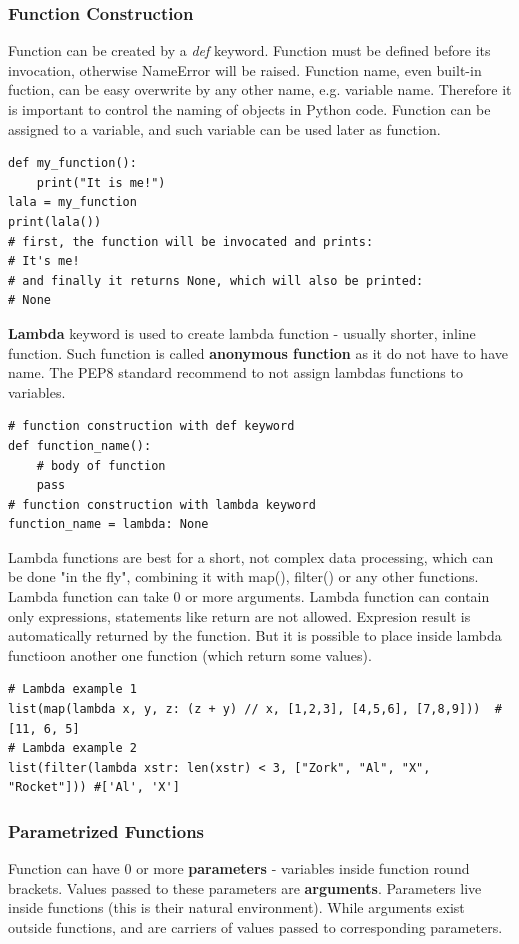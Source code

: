 \documentclass{article}
\begin{document}
	\subsubsection{Function Construction}
	Function can be created by a \textit{def} keyword. Function must be defined before its invocation, otherwise \textcolor{pythonerror}{NameError} will be raised. Function name, even built-in fuction, can be easy overwrite by any other name, e.g. variable name. Therefore it is important to control the naming of objects in Python code. 
Function can be assigned to a variable, and such variable can be used later as function.
\begin{lstlisting}[style=pystyle]
def my_function():
	print("It is me!")
lala = my_function
print(lala())
# first, the function will be invocated and prints:
# It's me!
# and finally it returns None, which will also be printed:
# None
\end{lstlisting}

\textbf{Lambda} keyword is used to create lambda function - usually shorter, inline function. Such function is called \textbf{anonymous function} as it do not have to have name. The PEP8 standard recommend to not assign lambdas functions to variables. 
	\begin{lstlisting}[style=pystyle]
# function construction with def keyword
def function_name():
	# body of function
	pass
# function construction with lambda keyword
function_name = lambda: None
	\end{lstlisting}
Lambda functions are best for a short, not complex data processing, which can be done "in the fly", combining it with map(), filter() or any other functions. Lambda function can take 0 or more arguments. Lambda function can contain only expressions, statements like return are not allowed. Expresion result is automatically returned by the function. But it is possible to place inside lambda functioon another one function (which return some values).
\begin{lstlisting}[style=pystyle]
# Lambda example 1
list(map(lambda x, y, z: (z + y) // x, [1,2,3], [4,5,6], [7,8,9]))	#[11, 6, 5]
# Lambda example 2
list(filter(lambda xstr: len(xstr) < 3, ["Zork", "Al", "X", "Rocket"]))	#['Al', 'X']
\end{lstlisting}

	
	\subsubsection{Parametrized Functions}
	Function can have 0 or more \textbf{parameters} - variables inside function round brackets. Values passed to these parameters are \textbf{arguments}. Parameters live inside functions (this is their natural environment). While arguments exist outside functions, and are carriers of values passed to corresponding parameters.
\end{document}
